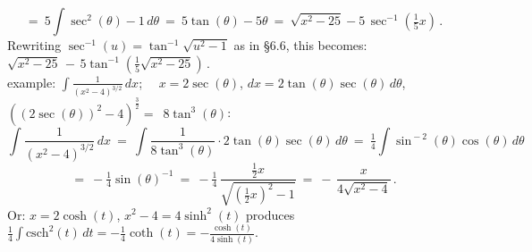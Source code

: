 \documentclass[11pt]{article}
\begin{document}
$$
\ =\
5\!\int\!\sec^2(\theta){-}1\,d\theta
\ =\
5\tan(\theta) - 5\theta
\ =\
\sqrt{x^2{-}25} - 5\,\sec^{-1}(\tfrac 15 x)\,.
$$
Rewriting $\sec^{-1}(u) = \tan^{-1}\!\sqrt{u^2{-}1}$ as in \S6.6, this becomes:
$
\sqrt{x^2{-}25} \,-\, 5\tan^{-1}(\frac15\sqrt{x^2{-}25})\,.
$
\\[1.5em]
{\sc example:} $\int\!\!\!\frac{1}{(x^2{-}4)^{3/2}}\,dx$; 
\ \  $x=2\sec(\theta)$, $dx = 2\tan(\theta)\sec(\theta)\,d\theta$, $((2\sec(\theta))^2{-}4)^{\frac32}=$~$8\tan^3(\theta)$:
$$
\int\!\!\!\frac{1}{(x^2{-}4)^{3/2}}\,dx
\ =\
\int\!\!\frac{1}{8\tan^3(\theta)}\cdot 2\tan(\theta)\sec(\theta)\,d\theta
\ =\
\tfrac14\!\int\!\sin^{\!-2}(\theta)\cos(\theta)\,d\theta
$$
$$
\ =\ -\tfrac14\sin(\theta)^{-1}
\ =\ 
-\tfrac14\,\frac{\frac12x}{\sqrt{\!(\frac12x)^2{-}1}}
\ =\ 
-\,\frac{x}{4\sqrt{x^2{-}4}}\,.
$$
Or: $x=2\cosh(t)$, $x^2{-}4=4\sinh^2(t)$ produces
$\frac14\int \mathrm{csch}^2(t)\,dt=-\frac14\coth(t)=-\frac{\cosh(t)}{4\sinh(t)}$.
%
\pagebreak
\end{document}
